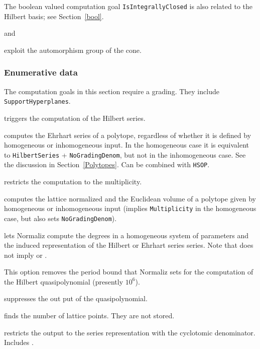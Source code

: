 The boolean valued computation goal \verb|IsIntegrallyClosed| is also related to the Hilbert basis; see Section~\ref{bool}.

\begin{itemize}
	 and

	 exploit the automorphism group of the cone.
\end{itemize}

\subsubsection{Enumerative data}

The computation goals in this section require a grading. They include \verb|SupportHyperplanes|.

\begin{itemize}
	\itemtt [HilbertSeries,-q] triggers the computation of the Hilbert series.
	
	\itemtt[EhrhartSeries] computes the Ehrhart series of a polytope, regardless of whether it is defined by homogeneous or inhomogeneous input. In the homogeneous case it is equivalent to \verb|HilbertSeries| + \verb|NoGradingDenom|, but not in the inhomogeneous case. See the discussion in Section~\ref{Polytopes}. Can be combined with \verb|HSOP|.
	
	\itemtt[Multiplicity, -v] restricts the computation to the multiplicity.
	
	\itemtt[Volume, -V] computes the lattice normalized and the Euclidean volume of a polytope given by homogeneous or inhomogeneous input (implies \verb|Multiplicity| in the homogeneous case, but also sets \verb|NoGradingDenom|).
	
	\itemtt[HSOP] lets Normaliz compute the degrees in a homogeneous system of parameters and the induced representation of the Hilbert or Ehrhart series series. Note that  does not imply  or .
	
	\itemtt[NoPeriodBound] This option removes the period bound that Normaliz sets for the computation of the Hilbert quasipolynomial (presently $10^6$).
	
	\itemtt[NoQuasiPolynomial] suppresses the out put of the quasipolynomial.
	
	\itemtt[NumberLatticePoints] finds the number of lattice points. They are not stored.
	
	\itemtt[OnlyCyclotomicHilbSer] restricts the output to the series representation with the cyclotomic denominator. Includes .
\end{itemize}

